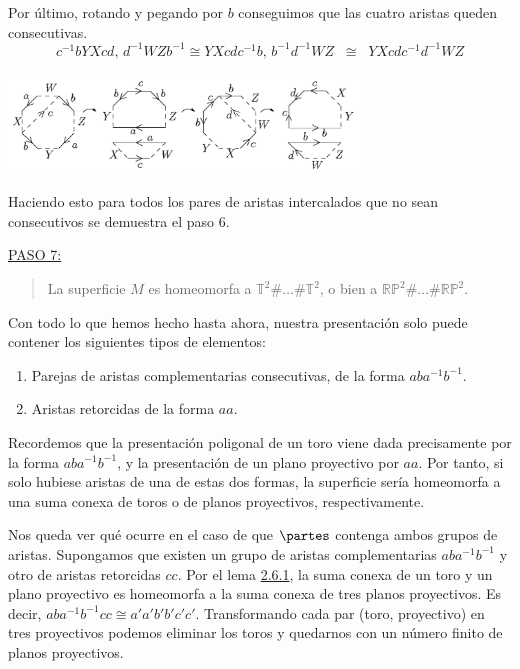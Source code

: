 {    \noindent
    Por último, rotando y pegando por $b$ conseguimos que las cuatro aristas queden consecutivas.
    \[
        c^{-1}bYXcd \text{, } d^{-1}WZb^{-1} \cong YXcdc^{-1}b \text{, } b^{-1}d^{-1}WZ \;\;\cong\;\; YXcdc^{-1}d^{-1}WZ
    \]

    \begin{center}
        \includegraphics[width=0.7\textwidth]{img/teorema-clasificacion/paso6.png}
    \end{center}

    \vspace{0.5em}
    \noindent
    Haciendo esto para todos los pares de aristas intercalados que no sean consecutivos se demuestra el paso 6.

    \vspace{1.3em}
    \noindent
    \underline{PASO 7:}
    \begin{quote}
        La superficie $M$ es homeomorfa a $\mathbb{T}^2\#\dots\#\mathbb{T}^2$, o bien a $\mathbb{RP}^2\#\dots\#\mathbb{RP}^2$.
    \end{quote}

    \noindent
    Con todo lo que hemos hecho hasta ahora, nuestra presentación solo puede contener los siguientes tipos de elementos:

    \begin{enumerate}
        \item Parejas de aristas complementarias consecutivas, de la forma $aba^{-1}b^{-1}$.
        \item Aristas retorcidas de la forma $aa$.
    \end{enumerate}

    \noindent
    Recordemos que la presentación poligonal de un toro viene dada precisamente por la forma $a b a^{-1} b^{-1}$, 
    y la presentación de un plano proyectivo por $aa$. 
    Por tanto, si solo hubiese aristas de una de estas dos formas, 
    la superficie sería homeomorfa a una suma conexa de toros o de planos proyectivos, respectivamente.

    \vspace{0.5em}
    \noindent
    Nos queda ver qué ocurre en el caso de que $\partes$ contenga ambos grupos de aristas. 
    Supongamos que existen un grupo de aristas complementarias $aba^{-1}b^{-1}$ y otro de aristas retorcidas $cc$. 
    Por el lema \hyperref[lem:toro-proyectivo]{2.6.1}, la suma conexa de un toro y un plano proyectivo es homeomorfa a la suma conexa de tres planos proyectivos. 
    Es decir, $aba^{-1}b^{-1}cc \cong a'a'b'b'c'c'$. 
    Transformando cada par (toro, proyectivo) en tres proyectivos podemos eliminar los toros y quedarnos con un número finito de planos proyectivos.

}

